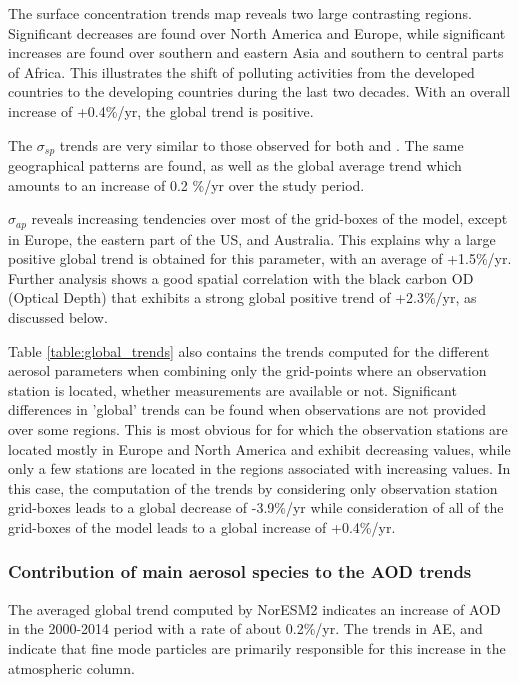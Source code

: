 \documentclass[acp, manuscript]{copernicus}
\begin{document}
The surface  concentration trends map reveals two large contrasting regions. Significant decreases are found over North America and Europe, while significant increases are found over southern and eastern Asia and southern to central parts of Africa. This illustrates the shift of polluting activities from the developed countries to the developing countries during the last two decades. With an overall increase of +0.4\%/yr, the global trend is positive.

The $\sigma_{sp}$ trends are very similar to those observed for both  and . The same geographical patterns are found, as well as the global average trend which amounts to an increase of 0.2 \%/yr over the study period.

$\sigma_{ap}$ reveals increasing tendencies over most of the grid-boxes of the model, except in Europe, the eastern part of the US, and Australia. This explains why a large positive global trend is obtained for this parameter, with an average of +1.5\%/yr. Further analysis shows a good spatial correlation with the black carbon OD (Optical Depth) that exhibits a strong global positive trend of +2.3\%/yr, as discussed below.

Table \ref{table:global_trends} also contains the trends computed for the different aerosol parameters when combining only the grid-points where an observation station is located, whether measurements are available or not. Significant differences in 'global' trends can be found when observations are not provided over some regions. This is most obvious for  for which the observation stations are located mostly in Europe and North America and exhibit decreasing values, while only a few stations are located in the regions associated with increasing values. In this case, the computation of the trends by considering only observation station grid-boxes leads to a global decrease of -3.9\%/yr while consideration of all of the grid-boxes of the model leads to a global increase of +0.4\%/yr.


\subsubsection{Contribution of main aerosol species to the AOD trends}

The averaged global trend computed by NorESM2 indicates an increase of AOD in the 2000-2014 period with a rate of about 0.2\%/yr. The trends in AE,  and  indicate that fine mode particles are primarily responsible for this increase in the atmospheric column.
\end{document}
